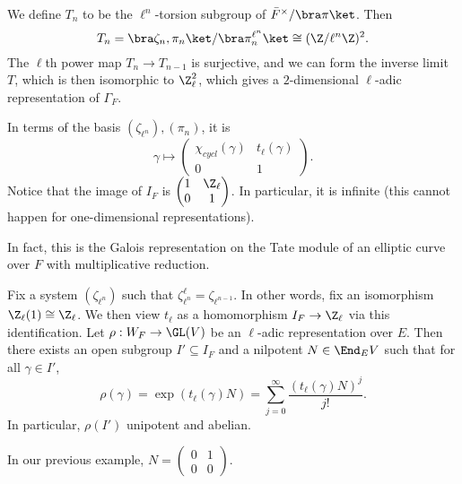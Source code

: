 \documentclass[a4paper]{article}
\begin{document}
\begin{eg}
  We define $T_n$ to be the $\ell^n$-torsion subgroup of $\bar{F}^\times/\bra \pi\ket$. Then
  \[
    T_n = \bra \zeta_n, \pi_n\ket / \bra \pi_n^{\ell^n}\ket \cong (\Z/\ell^n \Z)^2.
  \]
  The $\ell$th power map $T_n \to T_{n - 1}$ is surjective, and we can form the inverse limit $T$, which is then isomorphic to $\Z_{\ell}^2$, which gives a $2$-dimensional $\ell$-adic representation of $\Gamma_F$.

  In terms of the basis $(\zeta_{\ell^n}), (\pi_n)$, it is
  \[
    \gamma \mapsto
    \begin{pmatrix}
      \chi_{cycl}(\gamma) & t_\ell(\gamma)\\
      0 & 1
    \end{pmatrix}.
  \]
  Notice that the image of $I_F$ is $\begin{pmatrix} 1 & \Z_\ell \\0 & 1\end{pmatrix}$. In particular, it is infinite (this cannot happen for one-dimensional representations).

  In fact, this is the Galois representation on the Tate module of an elliptic curve over $F$ with multiplicative reduction. %
\end{eg}
\begin{thm}
  Fix a system $(\zeta_{\ell^n})$ such that $\zeta_{\ell^n}^\ell = \zeta_{\ell^{n - 1}}$. In other words, fix an isomorphism $\Z_{\ell}(1) \cong \Z_\ell$. We then view $t_\ell$ as a homomorphism $I_F \to \Z_\ell$ via this identification. Let $\rho: W_F \to \GL(V)$ be an $\ell$-adic representation over $E$. Then there exists an open subgroup $I' \subseteq I_F$ and a nilpotent $N \in \End_E V$ such that for all $\gamma \in I'$,
  \[
    \rho(\gamma) = \exp (t_\ell(\gamma) N) = \sum_{j = 0}^\infty \frac{(t_\ell(\gamma) N)^j}{j!}.
  \]
  In particular, $\rho(I')$ unipotent and abelian.
\end{thm}
In our previous example, $N = \begin{pmatrix}0 & 1\\0 & 0\end{pmatrix}$.
\end{document}
